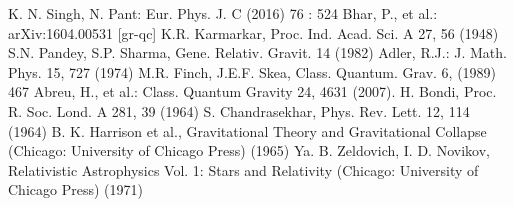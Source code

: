 \documentclass[preprintnumbers,amsmath,amssymb,floatfix,9pt,prd,twocolumn,
superscriptaddress,nofootinbib]{revtex4}
\begin{document}
\begin{thebibliography}{99}
 K. N. Singh, N. Pant:   Eur. Phys. J. C (2016) 76 : 524
   Bhar, P., et al.: 	arXiv:1604.00531 [gr-qc]
K.R. Karmarkar, Proc. Ind. Acad. Sci. A 27, 56 (1948)
S.N. Pandey, S.P. Sharma, Gene. Relativ. Gravit. 14 (1982)
 Adler, R.J.: J. Math. Phys. 15, 727 (1974)
 M.R. Finch, J.E.F. Skea, Class. Quantum. Grav. 6, (1989) 467
 Abreu, H., et al.: Class. Quantum Gravity 24, 4631 (2007).
H. Bondi, Proc. R. Soc. Lond. A 281, 39 (1964)
 S. Chandrasekhar, Phys. Rev. Lett. 12, 114 (1964)
  B. K. Harrison et al., Gravitational Theory and Gravitational Collapse (Chicago: University of Chicago Press) (1965)
 Ya. B. Zeldovich, I. D. Novikov, Relativistic Astrophysics Vol. 1: Stars and Relativity (Chicago: University
of Chicago Press) (1971)

\end{thebibliography}
\end{document}
